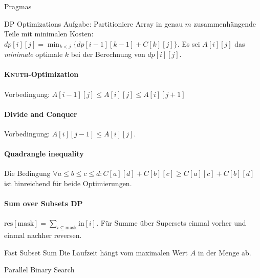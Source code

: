 \begin{algorithm}{Pragmas}
\end{algorithm}

\begin{algorithm}{DP Optimizations}
	Aufgabe: Partitioniere Array in genau $m$ zusammenhängende Teile mit minimalen Kosten:
	$dp[i][j] = \min_{k<j}\{dp[i-1][k-1]+C[k][j]\}$. Es sei $A[i][j]$ das \emph{minimale} optimale
	$k$ bei der Berechnung von $dp[i][j]$.
	
	\paragraph{\textsc{Knuth}-Optimization} Vorbedingung: $A[i - 1][j] \leq A[i][j] \leq A[i][j + 1]$
	
	
	\paragraph{Divide and Conquer}
	Vorbedingung: $A[i][j - 1] \leq A[i][j]$.
	
	
	\paragraph{Quadrangle inequality} Die Bedingung  $\forall a\leq b\leq c\leq d:
	C[a][d] + C[b][c] \geq C[a][c] + C[b][d]$ ist hinreichend für beide Optimierungen.
	
	\paragraph{Sum over Subsets DP} $\text{res}[\text{mask}]=\sum_{i\subseteq\text{mask}}\text{in}[i]$.
	Für Summe über Supersets  einmal vorher und einmal nachher reversen.
\end{algorithm}

\begin{algorithm}{Fast Subset Sum}
	Die Laufzeit hängt vom maximalen Wert $A$ in der Menge ab.
\end{algorithm}

\begin{algorithm}{Parallel Binary Search}
\end{algorithm}

